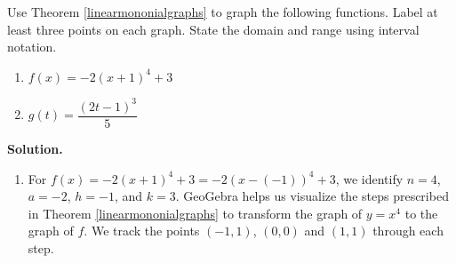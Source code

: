 \documentclass{ximera}
\begin{document}
\begin{example} \label{linearmonomialex}  Use Theorem \ref{linearmononialgraphs} to graph the following functions.  Label at least three points on each graph. State the domain and range using interval notation.
	

\begin{enumerate}


\item  $f(x) = -2(x+1)^4+3$ 

\item  $g(t) = \dfrac{(2t-1)^3}{5}$

\end{enumerate}



{\bf Solution.} 

\begin{enumerate}

\item For  $f(x) = -2(x+1)^4+3 = -2 (x-(-1))^4+3$, we identify $n = 4$, $a = -2$, $h = -1$, and $k = 3$.  GeoGebra helps us visualize the steps prescribed in Theorem \ref{linearmononialgraphs}  to transform the graph of $y = x^4$ to the graph of $f$.  We track the points $(-1,1)$, $(0,0)$ and $(1,1)$ through each step.

\begin{center}
\end{center}








\end{enumerate}
\end{example}
\end{document}
